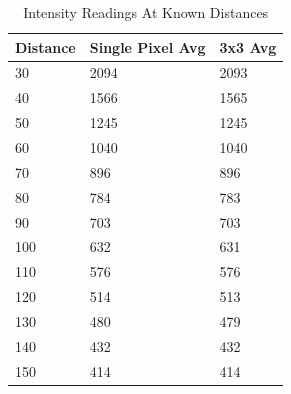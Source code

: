 \documentclass[conference]{IEEEtran}
\begin{document}
\begin{table}[]
\caption{Intensity Readings At Known Distances}
\label{tab:intensity_results}
\begin{tabular}{|l|l|l|}
\hline
\textbf{Distance} & \textbf{Single Pixel Avg} & \textbf{3x3 Avg} \\ \hline
30                 & 2094 & 2093         \\ \hline
40                & 1566 & 1565         \\ \hline
50                 & 1245 & 1245         \\ \hline
60                 & 1040 & 1040         \\ \hline
70                 & 896 & 896         \\ \hline
80                & 784 & 783         \\ \hline
90                & 703 & 703         \\ \hline
100                 & 632 & 631          \\ \hline
110      & 576 & 576           \\ \hline
120      & 514 & 513         \\ \hline
130                 & 480 &479          \\ \hline
140				& 432	& 432	\\ \hline
150				&	414 & 414	\\ \hline
\end{tabular}
\end{table} 
\end{document}
